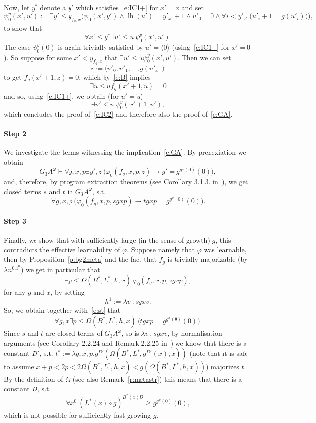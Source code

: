 \documentclass[1p]{elsarticle}
\newcommand{\be}[1][{e:\arabic{equation}}] { \begin{equation}\label{#1} }
\newcommand{\ee} { \end{equation} }
\DeclareMathOperator{\lh}{lh}  %
\theoremstyle{plain}
\theoremstyle{definition}
\theoremstyle{remark}
\renewenvironment{proof}[1][]{\noindent{\bf Proof{#1}. }}{\nopagebreak[4]{\hspace*{\fill}
  $\Box$              %
 }{\vspace{2ex}}}
\renewcommand{\phi}{\varphi}
\theoremstyle{definition}
\begin{document}
{\begin{proof}
Now, let $y^*$ denote a $y'$ which satisfies~\eqref{e:IC1+} for $x'=x$ and set \[
\psi^y_0(x',u'):=
\exists y'\leq y_{f_g,x} \Big( \psi_0(x',y') \wedge \lh(u')=y'_{x'}+1 \wedge u'_0=0 \wedge \forall i< y'_{x'}\ \big( u'_i+1=g(u'_i) \big)\Big),
\]
to show that \be[e:IC2]\forall x'\leq y^* \exists u'\leq u \ \psi^y_0(x',u').\ee
The case $\psi^y_0(0)$ is again trivially satisfied by $u'=\langle 0 \rangle$ (using~\eqref{e:IC1+} for $x'=0$).
So suppose for some $x'< y_{f_g,x}$ that
$\exists u'\leq u \psi^y_0(x',u')$. Then we can set
\[z:=\langle u'_0,u'_1,\ldots,g(u'_{x'})\] to get $f_g(x'+1,z)=0$,
which by~\eqref{e:B} implies 
\[\exists \tilde u\leq u f_g(x'+1, \tilde u)=0\]
and so, using~\eqref{e:IC1+}, we obtain (for $u'=\tilde u$)
\[
\exists u'\leq u\ \psi^y_0(x'+1,u'),
\]
which concludes the proof of~\eqref{e:IC2} and therefore also the proof of~\eqref{e:GA}.\\
\paragraph{Step 2} We investigate the terms witnessing the implication~\eqref{e:GA}. By prenexiation we obtain
\[
G_3A^\omega\vdash \forall g,x,p\exists y',z\ \big(\phi_0(f_g,x,p,z)\rightarrow y'=g^{g^{x}(0)}(0)\big),
\]
and, therefore, by program extraction theorems (see Corollary 3.1.3. in~\cite{Kohlenbach(lowrate)}), we get closed terms $s$ and $t$ in $G_3A^\omega$, s.t.
\be[e:st]
\forall g,x,p\ \big(\phi_0(f_g,x,p,sgxp)\rightarrow tgxp=g^{g^{x}(0)}(0)\big).
\ee
\paragraph{Step 3} Finally, we show that with sufficiently large (in the sense of growth) $g$, this contradicts the effective learnability of $\phi$. Suppose namely that $\phi$ was learnable,
then by Proposition~\ref{p:bg2meta} and the fact that $f_g$ is trivially majorizable (by $\lambda n^0.1^0$) we get in particular that 
\[
\exists p\leq \Omega(B^*,L^*,h,x)\ \phi_0(f_g,x,p, zgxp),
\]
for any $g$ and $x$, by setting \[h^1:=\lambda v\ .\ s gxv.\]
So, we obtain together with~\eqref{e:st} that
\[
\forall g,x \exists p\leq \Omega(B^*,L^*,h,x)\ \big( tgxp=g^{g^{x}(0)}(0)\big).
\]
Since $s$ and $t$ are closed terms of $G_3A^\omega$, so is $\lambda v\ .\ s gxv$, by normalisation arguments
(see Corollary 2.2.24 and Remark 2.2.25 in~\cite{Kohlenbach(lowrate)}) we know that there is 
a constant $D'$, s.t. $t^*:=\lambda g,x,p.g^{D'}(\Omega(B^*,L^*,g^{D'}(x),x))$ (note that it is safe to assume 
$x+p<2p<2\Omega(B^*,L^*,h,x)<g(\Omega(B^*,L^*,h,x))$) majorizes $t$. By the definition of $\Omega$ (see also Remark~\ref{r:metastr}) this means that there is a constant $D$, s.t. 
\[ \forall x^0\ (L^*(x)\circ g)^{B^*(x)D}\geq g^{g^{x}(0)}(0),\]
which is not possible for sufficiently fast growing $g$.
\end{proof}

}
\end{document}
